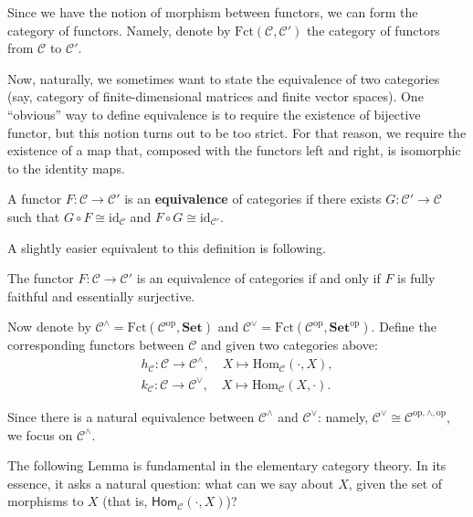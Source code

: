 \documentclass{category-template}
\begin{document}
Since we have the notion of morphism between functors, we can form the category
of functors. Namely, denote by $\text{Fct}(\mathcal{C},\mathcal{C}')$ the
category of functors from $\mathcal{C}$ to $\mathcal{C}'$.

Now, naturally, we sometimes want to state the equivalence of two categories
(say, category of finite-dimensional matrices and finite vector spaces). One
``obvious'' way to define equivalence is to require the existence of bijective
functor, but this notion turns out to be too strict. For that reason, we require
the existence of a map that, composed with the functors left and right, is
isomorphic to the identity maps.

\begin{definition}
    A functor $F: \mathcal{C} \to \mathcal{C}'$ is an \textbf{equivalence} of
    categories if there exists $G: \mathcal{C}' \to \mathcal{C}$ such that $G
    \circ F \cong \text{id}_{\mathcal{C}}$ and $F \circ G \cong
    \text{id}_{\mathcal{C}'}$.
\end{definition}

A slightly easier equivalent to this definition is following.

\begin{theorem}
    The functor $F: \mathcal{C} \to \mathcal{C}'$ is an equivalence of
    categories if and only if $F$ is fully faithful and essentially surjective.
\end{theorem}

Now denote by $\mathcal{C}^{\wedge} = \text{Fct}(\mathcal{C}^{\text{op}},
\textbf{Set})$ and $\mathcal{C}^{\vee} = \text{Fct}(\mathcal{C}^{\text{op}},
\textbf{Set}^{\text{op}})$. Define the corresponding functors between 
$\mathcal{C}$ and given two categories above:
\begin{gather*}
    h_{\mathcal{C}}: \mathcal{C} \to \mathcal{C}^{\wedge}, \quad X \mapsto \text{Hom}_{\mathcal{C}}(\cdot, X),\\
    k_{\mathcal{C}}: \mathcal{C} \to \mathcal{C}^{\vee}, \quad X \mapsto \text{Hom}_{\mathcal{C}}(X, \cdot).
\end{gather*}

Since there is a natural equivalence between $\mathcal{C}^{\wedge}$ and
$\mathcal{C}^{\vee}$: namely, $\mathcal{C}^{\vee} \cong
\mathcal{C}^{\text{op},\wedge,\text{op}}$, we focus on $\mathcal{C}^{\wedge}$.

The following Lemma is fundamental in the elementary category theory. In its
essence, it asks a natural question: what can we say about $X$, given the set of
morphisms to $X$ (that is, $\mathsf{Hom}_{\mathcal{C}}(\cdot,X)$)?
\end{document}
